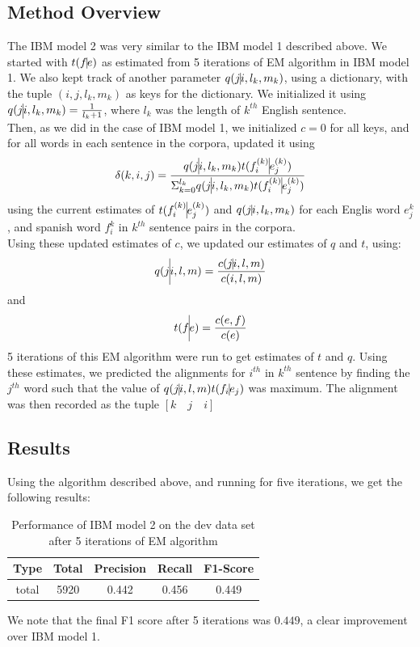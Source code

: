 \documentclass{article}
\begin{document}
	\subsection{Method Overview}
		The IBM model 2 was very similar to the IBM model 1 described above. We started with $t(f \vline e)$ as estimated from 5 iterations of EM algorithm in IBM model 1. We also kept track of another parameter $q(j \vline i,l_{k},m_{k})$, using a dictionary, with the tuple $(i,j,l_{k},m_{k})$ as keys for the dictionary. We initialized it using $q(j \vline i,l_{k},m_{k})=\frac{1}{l_{k}+1}$, where $l_{k}$ was the length of $k^{th}$ English sentence.
		\\Then, as we did in the case of IBM model 1, we initialized $c=0$ for all keys, and for all words in each sentence in the corpora, updated it using 
		$$\delta(k,i,j) = \frac{q(j \vline i,l_{k},m_{k})t(f_{i}^{(k)} \vline e_{j}^{(k)})}{\Sigma_{k=0}^{l_{k}} q(j \vline i,l_{k},m_{k})t(f_{i}^{(k)} \vline e_{j}^{(k)})} $$
		using the current estimates of $t(f_{i}^{(k)} \vline e_{j}^{(k)})$ and $q(j \vline i,l_{k},m_{k})$ for each Englis word $e_{j}^{k}$, and spanish word $f_{i}^{k}$ in $k^{th}$ sentence pairs in the corpora. 
		\\Using these updated estimates of $c$, we updated our estimates of $q$ and $t$, using:
		$$q(j \vline i,l,m) = \frac{c(j \vline i,l,m)}{c(i,l,m)} $$
		and $$t(f \vline e) = \frac{c(e,f)}{c(e)} $$
		5 iterations of this EM algorithm were run to get estimates of $t$ and $q$. Using these estimates, we predicted the alignments for $i^{th}$ in $k^{th}$ sentence by finding the $j^{th}$ word such that the value of $q(j \vline i,l,m)t(f_{i} \vline e_{j})$ was maximum. The alignment was then recorded as the tuple $\left[k\quad j\quad i\right]$
	\subsection{Results}
		Using the algorithm described above, and running for five iterations, we get the following results:
		\begin{table}[htbp]
			\center
			\begin{tabular}{|c|c|c|c|c|}
				\hline
				Type&Total&Precision&Recall&F1-Score\\
				\hline
				total&        5920&     0.442&        0.456&        0.449\\
				\hline
			\end{tabular}
			\caption{Performance of IBM model 2 on the dev data set after 5 iterations of EM algorithm}
		\end{table}
		We note that the final F1 score after 5 iterations was $0.449$, a clear improvement over IBM model 1.
\end{document}
